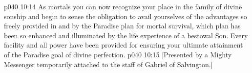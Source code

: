 \vs p040 10:14 As mortals you can now recognize your place in the family of divine sonship and begin to sense the obligation to avail yourselves of the advantages so freely provided in and by the Paradise plan for mortal survival, which plan has been so enhanced and illuminated by the life experience of a bestowal Son. Every facility and all power have been provided for ensuring your ultimate attainment of the Paradise goal of divine perfection.
\vsetoff
\vs p040 10:15 [Presented by a Mighty Messenger temporarily attached to the staff of Gabriel of Salvington.]
\quizlink
